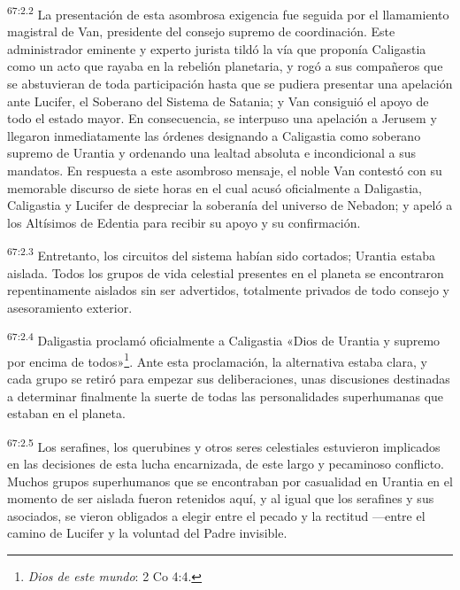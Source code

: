 \par
\textsuperscript{67:2.2} La presentación de esta asombrosa exigencia fue seguida por el llamamiento magistral de Van, presidente del consejo supremo de coordinación. Este administrador eminente y experto jurista tildó la vía que proponía Caligastia como un acto que rayaba en la rebelión planetaria, y rogó a sus compañeros que se abstuvieran de toda participación hasta que se pudiera presentar una apelación ante Lucifer, el Soberano del Sistema de Satania; y Van consiguió el apoyo de todo el estado mayor. En consecuencia, se interpuso una apelación a Jerusem y llegaron inmediatamente las órdenes designando a Caligastia como soberano supremo de Urantia y ordenando una lealtad absoluta e incondicional a sus mandatos. En respuesta a este asombroso mensaje, el noble Van contestó con su memorable discurso de siete horas en el cual acusó oficialmente a Daligastia, Caligastia y Lucifer de despreciar la soberanía del universo de Nebadon; y apeló a los Altísimos de Edentia para recibir su apoyo y su confirmación.

\par
\textsuperscript{67:2.3} Entretanto, los circuitos del sistema habían sido cortados; Urantia estaba aislada. Todos los grupos de vida celestial presentes en el planeta se encontraron repentinamente aislados sin ser advertidos, totalmente privados de todo consejo y asesoramiento exterior.

\par
\textsuperscript{67:2.4} Daligastia proclamó oficialmente a Caligastia «Dios de Urantia y supremo por encima de todos»\footnote{\textit{Dios de este mundo}: 2 Co 4:4.}. Ante esta proclamación, la alternativa estaba clara, y cada grupo se retiró para empezar sus deliberaciones, unas discusiones destinadas a determinar finalmente la suerte de todas las personalidades superhumanas que estaban en el planeta.

\par
\textsuperscript{67:2.5} Los serafines, los querubines y otros seres celestiales estuvieron implicados en las decisiones de esta lucha encarnizada, de este largo y pecaminoso conflicto. Muchos grupos superhumanos que se encontraban por casualidad en Urantia en el momento de ser aislada fueron retenidos aquí, y al igual que los serafines y sus asociados, se vieron obligados a elegir entre el pecado y la rectitud ---entre el camino de Lucifer y la voluntad del Padre invisible.

